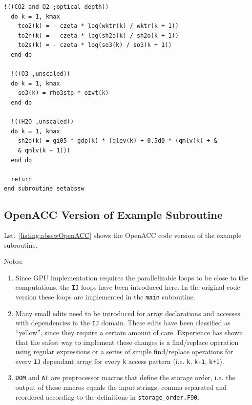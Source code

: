 \begin{lstlisting}[name=absswOpenACC, label=listing:absswOriginal, caption={Example ASUCA subroutine (original CPU optimized version).}]
  !((CO2 and O2 ;optical depth))
  do k = 1, kmax
    tco2(k) = - czeta * log(wktr(k) / wktr(k + 1))
    to2n(k) = - czeta * log(sh2o(k) / sh2o(k + 1))
    to2s(k) = - czeta * log(so3(k) / so3(k + 1))
  end do
  
  !((O3 ,unscaled))
  do k = 1, kmax
    so3(k) = rho3stp * ozvt(k)
  end do
  
  !((H2O ,unscaled))
  do k = 1, kmax
    sh2o(k) = gi05 * gdp(k) * (qlev(k) + 0.5d0 * (qmlv(k) + &
    & qmlv(k + 1)))
  end do
  
  return
end subroutine setabssw
\end{lstlisting}

\subsection{OpenACC Version of Example Subroutine}

Lst.~\ref{listing:absswOpenACC} shows the OpenACC code version of the example subroutine. 

Notes: 
\begin{enumerate}
 \item Since GPU implementation requires the parallelizable loops to be close to the computations, the \verb|IJ| loops have been introduced here. In the original code version these loops are implemented in the \verb|main| subroutine.
 \item Many small edits need to be introduced for array declarations and accesses with dependencies in the \verb|IJ| domain. These edits have been classified as \textquotedblleft yellow\textquotedblright, since they require a certain amount of care. Experience has shown that the safest way to implement these changes is a find/replace operation using regular expressions or a series of simple find/replace operations for every \verb|IJ| dependant array for every \verb|k| access pattern (i.e. \verb|k|, \verb|k-1|, \verb|k+1|).
 \item \verb|DOM| and \verb|AT| are preprocessor macros that define the storage order, i.e. the output of these macros equals the input strings, comma separated and reordered according to the definitions in \verb|storage_order.F90|.
\end{enumerate}

